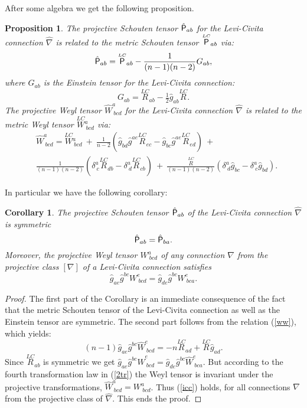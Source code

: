 \documentclass[letterpaper]{amsart}
\newtheorem{proposition}[theorem]{Proposition}
\newtheorem{corollary}[theorem]{Corollary}
\theoremstyle{definition}
\theoremstyle{remark}
\newcommand{\be}{\begin{equation}}
\newcommand{\ee}{\end{equation}}
\newcommand{\weyl}{{\stackrel{\scriptscriptstyle{LC}}{W}}\phantom{}}
\newcommand{\schou}{{\stackrel{\scriptscriptstyle{LC}}{\Rho}}}
\newcommand{\rlc}{{\stackrel{\scriptscriptstyle{LC}}{R}}}
\newcommand{\Rho}{{\mbox{\sf P}}}
\begin{document}
After some algebra we get the following proposition.
\begin{proposition}\label{pr211} 
The projective Schouten tensor $\hat{\Rho}_{ab}$ for the
Levi-Civita connection $\hat{\nabla}$ \emph{is related} to the metric
Schouten tensor $\schou_{ab}$ via:
$$\hat{\Rho}_{ab}=\schou_{ab}-\frac{1}{(n-1)(n-2)}G_{ab},$$
where $G_{ab}$ is the \emph{Einstein tensor} for the Levi-Civita 
connection:
$$G_{ab}=\rlc_{ab}-\tfrac12 \hat{g}_{ab}\rlc.$$
The projective Weyl tensor $\hat{W}^a_{~bcd}$ for the
Levi-Civita connection $\hat{\nabla}$ is related to 
the metric Weyl tensor $\weyl^a_{~bcd}$ via:
\be
\begin{aligned}
&\hat{W}^a_{~bcd}=\weyl^a_{~bcd}~+~\frac{1}{n-2}(\hat{g}_{bd}\hat{g}^{ae}\rlc_{ec}-\hat{g}_{bc}\hat{g}^{ae}\rlc_{ed})~+\\
&\frac{1}{(n-1)(n-2)}(\delta^a_{~c}\rlc_{db}-\delta^a_{~d}\rlc_{cb})~+~
\frac{\rlc}{(n-1)(n-2)}(\delta^a_{~d}\hat{g}_{bc}-\delta^a_{~c}\hat{g}_{bd}).\end{aligned}\label{ww}\ee
\end{proposition}
In particular we have the following corollary:
\begin{corollary}\label{co222}
The projective Schouten tensor $\hat{\Rho}_{ab}$ of the Levi-Civita
connection $\hat{\nabla}$ is symmetric
$$\hat{\Rho}_{ab}=\hat{\Rho}_{ba}.$$
Moreover, the projective Weyl tensor $W^a_{~bcd}$ of \emph{any}
connection $\nabla$ from the projective class $[\nabla]$ of a 
Levi-Civita connection
satisfies
\be
\hat{g}_{ae}\hat{g}^{bc}W^e_{~bcd}=
\hat{g}_{de}\hat{g}^{bc}W^e_{~bca}.\label{icc}\ee
\end{corollary}
\begin{proof}
The first part of the Corollary is an immediate consequence of 
the fact that the metric Schouten tensor
of the Levi-Civita connection as well as the Einstein tensor are symmetric. The second part follows
from the relation (\ref{ww}), which yields:
$$(n-1)\hat{g}_{ae}\hat{g}^{bc}\hat{W}^e_{~bcd}=-n\rlc_{ad}+\rlc \hat{g}_{ad}.$$
Since $\rlc_{ab}$ is symmetric we get $\hat{g}_{ae}\hat{g}^{bc}\hat{W}^e_{~bcd}=
\hat{g}_{de}\hat{g}^{bc}\hat{W}^e_{~bca}$. But according to the
fourth transformation law in (\ref{2tr}) the Weyl tensor is invariant
under the projective transformations,
$\hat{W}^a_{~bcd}=W^a_{~bcd}$. Thus (\ref{icc}) holds, for all
connections $\nabla$ from the projective class of $\hat{\nabla}$. 
This ends the proof.
\end{proof}
\end{document}
